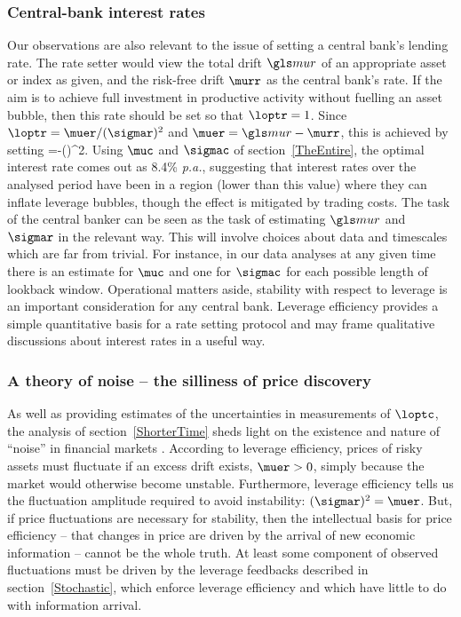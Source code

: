 \subsubsection{Central-bank interest rates}
Our observations are also relevant to the issue of setting a central bank's lending rate. The rate setter would view the total drift $\mur$ of an appropriate asset or index as given, and the risk-free drift $\murr$ as the central bank's rate. If the aim is to achieve full investment in productive activity without fuelling an asset bubble, then this rate should be set so that $\loptr=1$. Since $\loptr=\muer/(\sigmar)^2$ and $\muer=\mur-\murr$, this is achieved by setting 
\be
\murr=\mur-(\sigmar)^2.
\ee
Using $\muc$ and $\sigmac$ of section~\ref{TheEntire}, the optimal interest rate comes out as 8.4\% {\it p.a.}, suggesting that interest rates over the analysed period have been in a region (lower than this value) where they can inflate leverage bubbles, though the effect is mitigated by trading costs. The task of the central banker can be seen as the task of estimating $\mur$ and $\sigmar$ in the relevant way. This will involve choices about data and timescales which are far from trivial. For instance, in our data analyses at any given time there is an estimate for $\muc$ and one for $\sigmac$ for each possible length of lookback window. Operational matters aside, stability with respect to leverage is an important consideration for any central bank. Leverage efficiency provides a simple quantitative basis for a rate setting protocol and may frame qualitative discussions about interest rates in a useful way.


\subsubsection{A theory of noise -- the silliness of price discovery}
As well as providing estimates of the uncertainties in measurements of $\loptc$, the analysis of section~\ref{ShorterTime} sheds light on the existence and nature of ``noise'' in financial markets \citep{Black1986}. According to leverage efficiency, prices of risky assets must fluctuate if an excess drift exists, $\muer>0$, simply because the market would otherwise become unstable. Furthermore, leverage efficiency tells us the fluctuation amplitude required to avoid instability: $(\sigmar)^2=\muer$. But, if price fluctuations are necessary for stability, then the intellectual basis for price efficiency -- that changes in price are driven by the arrival of new economic information --  cannot be the whole truth. At least some component of observed fluctuations must be driven by the leverage feedbacks described in section~\ref{Stochastic}, which enforce leverage efficiency and which have little to do with information arrival.

